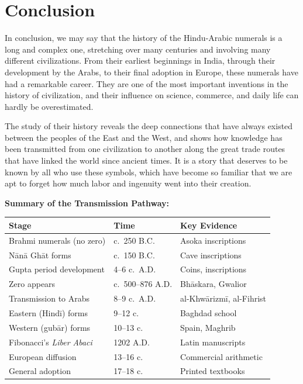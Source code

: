 \documentclass[11pt,a4paper]{article}
\newenvironment{enhancednote}{%
  \begin{tcolorbox}[colback=enhancedbg,colframe=notecolor,boxrule=1pt,
    left=10pt,right=10pt,top=8pt,bottom=8pt,
    title={\textbf{Enhanced Edition Note}},fonttitle=\bfseries\color{notecolor}]
}{\end{tcolorbox}}
\begin{document}
\newpage

\section*{Conclusion}

In conclusion, we may say that the history of the Hindu-Arabic numerals is a long and complex one, stretching over many centuries and involving many different civilizations. From their earliest beginnings in India, through their development by the Arabs, to their final adoption in Europe, these numerals have had a remarkable career. They are one of the most important inventions in the history of civilization, and their influence on science, commerce, and daily life can hardly be overestimated.

The study of their history reveals the deep connections that have always existed between the peoples of the East and the West, and shows how knowledge has been transmitted from one civilization to another along the great trade routes that have linked the world since ancient times. It is a story that deserves to be known by all who use these symbols, which have become so familiar that we are apt to forget how much labor and ingenuity went into their creation.

\begin{enhancednote}
\textbf{Summary of the Transmission Pathway:}

\begin{center}
\begin{tabular}{|l|l|l|}
\hline
\textbf{Stage} & \textbf{Time} & \textbf{Key Evidence} \\
\hline
Brahmi numerals (no zero) & c.~250 B.C. & Asoka inscriptions \\
N\=an\=a Gh\=at forms & c.~150 B.C. & Cave inscriptions \\
Gupta period development & 4--6 c.~A.D. & Coins, inscriptions \\
Zero appears & c.~500--876 A.D. & Bh\=askara, Gwalior \\
\hline
Transmission to Arabs & 8--9 c.~A.D. & al-Khw\=arizm\=i, al-Fihrist \\
Eastern (Hind\=i) forms & 9--12 c. & Baghdad school \\
Western (gub\=ar) forms & 10--13 c. & Spain, Maghrib \\
\hline
Fibonacci's \textit{Liber Abaci} & 1202 A.D. & Latin manuscripts \\
European diffusion & 13--16 c. & Commercial arithmetic \\
General adoption & 17--18 c. & Printed textbooks \\
\hline
\end{tabular}
\end{center}
\end{enhancednote}
\end{document}
